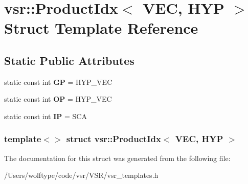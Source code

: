 \hypertarget{structvsr_1_1_product_idx_3_01_v_e_c_00_01_h_y_p_01_4}{\section{vsr\-:\-:Product\-Idx$<$ V\-E\-C, H\-Y\-P $>$ Struct Template Reference}
\label{structvsr_1_1_product_idx_3_01_v_e_c_00_01_h_y_p_01_4}
}
\subsection*{Static Public Attributes}
\begin{DoxyCompactItemize}
\item 
\hypertarget{structvsr_1_1_product_idx_3_01_v_e_c_00_01_h_y_p_01_4_a77c34e23e14c58c6794c593da3b6f697}{static const int {\bfseries G\-P} = H\-Y\-P\-\_\-\-V\-E\-C}\label{structvsr_1_1_product_idx_3_01_v_e_c_00_01_h_y_p_01_4_a77c34e23e14c58c6794c593da3b6f697}

\item 
\hypertarget{structvsr_1_1_product_idx_3_01_v_e_c_00_01_h_y_p_01_4_a7ab5097b68cd9819b98e741c645621d8}{static const int {\bfseries O\-P} = H\-Y\-P\-\_\-\-V\-E\-C}\label{structvsr_1_1_product_idx_3_01_v_e_c_00_01_h_y_p_01_4_a7ab5097b68cd9819b98e741c645621d8}

\item 
\hypertarget{structvsr_1_1_product_idx_3_01_v_e_c_00_01_h_y_p_01_4_acbdcccf3bf729896a9de5963cc56dd05}{static const int {\bfseries I\-P} = S\-C\-A}\label{structvsr_1_1_product_idx_3_01_v_e_c_00_01_h_y_p_01_4_acbdcccf3bf729896a9de5963cc56dd05}

\end{DoxyCompactItemize}
\subsubsection*{template$<$$>$ struct vsr\-::\-Product\-Idx$<$ V\-E\-C, H\-Y\-P $>$}



The documentation for this struct was generated from the following file\-:\begin{DoxyCompactItemize}
\item 
/\-Users/wolftype/code/vsr/\-V\-S\-R/vsr\-\_\-templates.\-h\end{DoxyCompactItemize}
